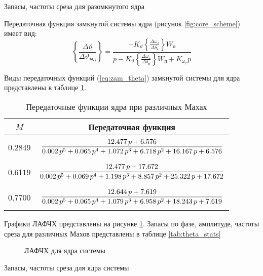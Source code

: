 \begin{table}[H]
    \centering
    \caption{Запасы, частоты среза для разомкнутого ядра} 
    \label{tab:theta_ol_stats}
    
\end{table}


Передаточная функция замкнутой системы ядра (рисунок \ref{fig:core_scheme}) имеет вид:
\begin{equation}
    \left\{ \frac{\Delta \vartheta}{\Delta \vartheta_{зад}} \right\} = \frac{-K_{\vartheta}\left\{\frac{\Delta \omega_z}{\Delta \delta_\text{в}} \right\} W_п}{p - K_\vartheta \left\{\frac{\Delta \omega_z}{\Delta \delta_\text{в}} \right\} W_п + K_{\omega_z} p} 
    \label{eq:zam_theta}
\end{equation}

Виды передаточных функций (\ref{eq:zam_theta}) замкнутой системы для ядра представлены в таблице \ref{tab:core_tf}.

\begin{table}[H]
    \centering
    \caption{Передаточные функции ядра при различных Махах}
    \label{tab:core_tf}
    \begin{tabular}{|c|c|}
        \hline
    $M$ & Передаточная функция\\ 
    \hline
    0.2849 & $\displaystyle \frac{12.477\,p+6.576}{0.002\,p^5+0.065\,p^4+1.072\,p^3+6.718\,p^2+16.167\,p+6.576}\addstrut{3em}$\\ 
    \hline
    0.6119 & $\displaystyle \frac{12.477\,p+17.672}{0.002\,p^5+0.069\,p^4+1.198\,p^3+8.857\,p^2+25.322\,p+17.672}\addstrut{3em}$\\
    \hline
    0.7700 & $\displaystyle \frac{12.644\,p+7.619}{0.002\,p^5+0.065\,p^4+1.079\,p^3+6.958\,p^2+18.243\,p+7.619}\addstrut{3em}$ \\
    \hline
    \end{tabular}
\end{table}

Графики ЛАФЧХ представлены на рисунке \ref{fig:theta}. Запасы по фазе, амплитуде, частоты среза для различных Махов представлены в таблице \ref{tab:theta_stats}
\begin{figure}[H]
    \centering
    
    \caption{ЛАФЧХ для ядра системы}
    \label{fig:theta}
\end{figure}

\begin{table}[H]
    \centering
    \caption{Запасы, частоты среза для ядра системы}
    \label{tab:theta_stats}
    
\end{table}

